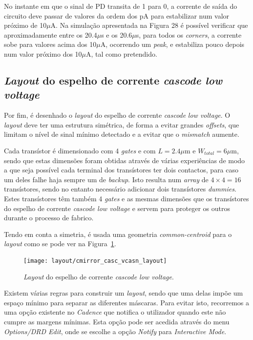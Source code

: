 \documentclass[11pt]{article}
\numberwithin{equation}{section}
\begin{document}
No instante em que o sinal de PD transita de 1 para 0, a corrente de saída do circuito deve passar de valores da ordem dos pA para estabilizar num valor próximo de 10$\mu$A. Na simulação apresentada na Figura 28 é possível verificar que aproximadamente entre os 20.4$\mu$s e os 20.6$\mu$s, para todos os \textit{corners}, a corrente sobe para valores acima dos 10$\mu$A, ocorrendo um \textit{peak}, e estabiliza pouco depois num valor próximo dos 10$\mu$A, tal como pretendido. 

\subsection{\textit{Layout} do espelho de corrente \textit{cascode low voltage}}

Por fim, é desenhado o \textit{layout} do espelho de corrente \textit{cascode} \textit{low voltage}. O \textit{layout} deve ter uma estrutura simétrica, de forma a evitar grandes \textit{offsets}, que limitam o nível de sinal mínimo detectado e a evitar que o \textit{mismatch} aumente.

Cada transístor é dimensionado com 4 \textit{gates} e com $L = 2.4 \mu$m e $W_{total} = 6\mu$m, sendo que estas dimensões foram obtidas através de várias experiências de modo a que seja possível cada terminal dos transístores ter dois contactos, para caso um deles falhe haja sempre um de \textit{backup}. Isto resulta num \textit{array} de $4\times4 = 16$ transístores, sendo no entanto necessário adicionar dois transístores \textit{dummies}. Estes transístores têm também 4 \textit{gates} e as mesmas dimensões que os transístores do espelho de corrente \textit{cascode low voltage} e servem para proteger os outros durante o processo de fabrico.

Tendo em conta a simetria, é usada uma geometria \textit{common-centroid} para o \textit{layout} como se pode ver na Figura~\ref{fig:layout}.

\begin{figure}[h]
	\centering
	\texttt{[image: layout/cmirror\_casc\_vcasn\_layout]}
	\vspace{-2em}
	\caption{\textit{Layout} do espelho de corrente \textit{cascode low voltage}.}
	\label{fig:layout}
	\vspace{-0.8em}
\end{figure}

Existem várias regras para construir um \textit{layout}, sendo que uma delas impõe um espaço mínimo para separar as diferentes máscaras. Para evitar isto, recorremos a uma opção existente no \textit{Cadence} que notifica o utilizador quando este não cumpre as margens mínimas. Esta opção pode ser acedida através do menu \textit{Options/DRD Edit}, onde se escolhe a opção \textit{Notify} para \textit{Interactive Mode}.
\end{document}
